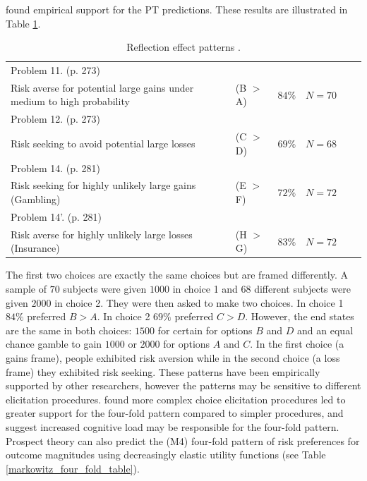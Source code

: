 \documentclass{article}\usepackage[]{graphicx}\usepackage[]{color}
\begin{document}
\cite{Kahneman_Tversky_1979} found empirical support for the PT predictions. These results are illustrated in
Table \ref{reflection_effect_table}.

\begin{table}[h]
\caption{Reflection effect patterns \cite[from][]{Kahneman_Tversky_1979}.}
\centering
\begin{tabular}{ l l l l l l }
\hline
Problem 11. (p. 273) \\
Risk averse for potential large gains under medium to high probability & (B $>$ A) & $84\%$ & $N=70$ \\
Problem 12. (p. 273) \\
Risk seeking to avoid potential large losses & (C $>$ D) & $69\%$ & $N=68$ \\
Problem 14. (p. 281) \\
Risk seeking for highly unlikely large gains (Gambling) & (E $>$ F) & $72\%$ & $N=72$ \\
Problem 14'. (p. 281) \\
Risk averse for highly unlikely large losses (Insurance) & (H $>$ G) & $83\%$ & $N=72$ \\
\hline
\end{tabular}
\label{reflection_effect_table}
\end{table}

The first two choices are exactly the same choices but are framed differently.
A sample of $70$ subjects were given $1000$ in choice 1 and $68$ different subjects were given $2000$ in choice 2. They were then asked to make two choices. In choice 1 $84\%$ preferred $B > A$. In choice 2 $69\%$ preferred $C > D$. However, the end states are the same in both choices: $1500$ for certain for options $B$ and $D$ and an equal chance gamble to gain $1000$ or $2000$ for options $A$ and $C$. In the first choice (a gains frame), people exhibited risk aversion while in the second choice (a loss frame) they exhibited risk seeking. These patterns have been empirically supported by other researchers, however the patterns may be sensitive to different elicitation procedures. \citet[][]{Harbaugh_Krause_Vesterlund_2010} found more complex choice elicitation procedures led to greater support for the four-fold pattern compared to simpler procedures,
and suggest increased cognitive load may be responsible for the four-fold pattern. Prospect theory can
also predict the (M4) \cite{Markowitz_1952} four-fold pattern of risk preferences for outcome magnitudes  using decreasingly elastic utility functions \cite[][]{Scholten_Read_2014} (see Table \ref{markowitz_four_fold_table}).
\end{document}
